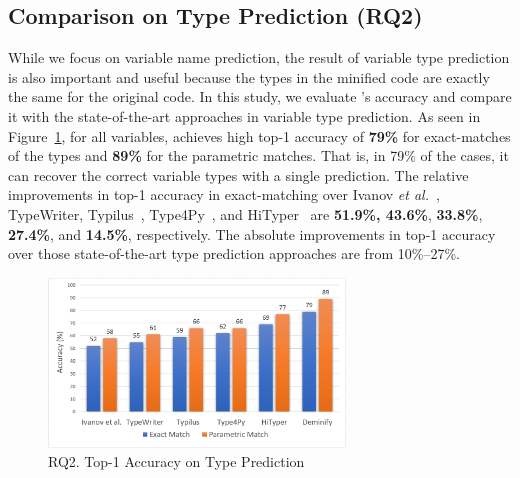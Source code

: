 \subsection{{\bf Comparison on Type Prediction (RQ2)}}
\label{empirical-rq2}




While we focus on variable name prediction, the result of variable
type prediction is also important and useful because the types in the
minified code are exactly the same for the original code.  In this
study, we evaluate {\tool}'s accuracy and compare it with the
state-of-the-art approaches in variable type prediction. As seen in
Figure~\ref{type-prediction-result}, for all variables, {\tool}
achieves high top-1 accuracy of {\bf 79\%} for exact-matches of the
types and {\bf 89\%} for the parametric matches. That is, in 79\% of
the cases, it can recover the correct variable types with a single
prediction.
%
The relative improvements in top-1 accuracy in exact-matching over
Ivanov {\em et al.}~\cite{ivanov21predicting}, TypeWriter\cite{typewriter-fse20},
Typilus~\cite{typilus-pldi20}, 
Type4Py~\cite{Type4Py-icse22}, and HiTyper~\cite{HiTyper-icse22} are
{\bf 51.9\%, 43.6\%}, {\bf 33.8\%}, {\bf 27.4\%}, and {\bf
  14.5\%}, respectively. The absolute improvements in top-1 accuracy
over those state-of-the-art type prediction approaches are from
10\%--27\%.

\begin{figure}[t]%
\begin{center}
\includegraphics[width=3.1in]{figures/type-prediction-result-2}
\vspace{-8pt}
\caption{RQ2. Top-1 Accuracy on Type Prediction}
\label{type-prediction-result}
\end{center}
\end{figure}

